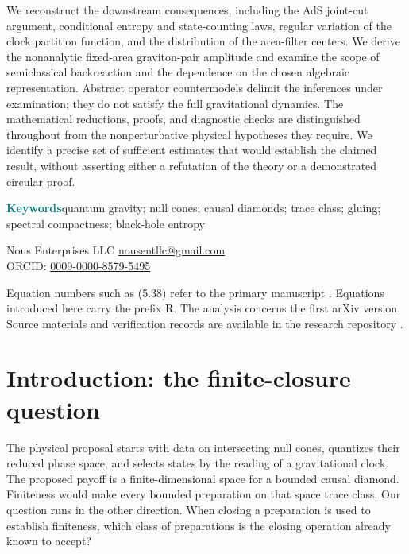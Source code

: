 \documentclass[11pt]{article}
\begin{document}
We reconstruct the downstream consequences, including the AdS joint-cut argument, conditional entropy and state-counting laws, regular variation of the clock partition function, and the distribution of the area-filter centers. We derive the nonanalytic fixed-area graviton-pair amplitude and examine the scope of semiclassical backreaction and the dependence on the chosen algebraic representation. Abstract operator countermodels delimit the inferences under examination; they do not satisfy the full gravitational dynamics. The mathematical reductions, proofs, and diagnostic checks are distinguished throughout from the nonperturbative physical hypotheses they require. We identify a precise set of sufficient estimates that would establish the claimed result, without asserting either a refutation of the theory or a demonstrated circular proof.

\medskip\noindent\textcolor{teal}{\textbf{Keywords}}\quad quantum gravity; null cones; causal diamonds; trace class; gluing; spectral compactness; black-hole entropy

\medskip\noindent Nous Enterprises LLC \enspace\textbar\enspace \href{mailto:nousentllc@gmail.com}{nousentllc@gmail.com}\\ORCID: \href{https://orcid.org/0009-0000-8579-5495}{0009-0000-8579-5495}

\clearpage
\tableofcontents
\medskip\noindent\small Equation numbers such as (5.38) refer to the primary manuscript \cite{VC}. Equations introduced here carry the prefix R. The analysis concerns the first arXiv version. Source materials and verification records are available in the research repository \cite{repo}.\normalsize
\clearpage
\renewcommand{\theequation}{R\arabic{equation}}

\section{Introduction: the finite-closure question}\label{sec:intro}
The physical proposal starts with data on intersecting null cones, quantizes their reduced phase space, and selects states by the reading of a gravitational clock. The proposed payoff is a finite-dimensional space for a bounded causal diamond. Finiteness would make every bounded preparation on that space trace class. Our question runs in the other direction. When closing a preparation is used to establish finiteness, which class of preparations is the closing operation already known to accept?
\end{document}
